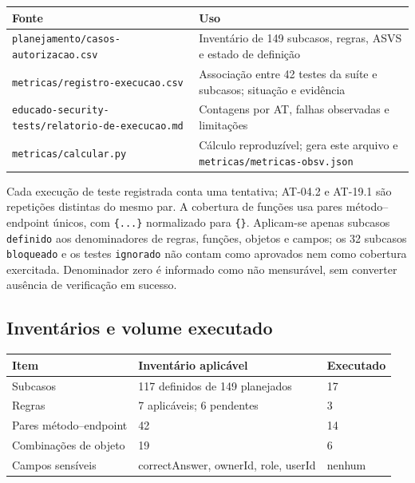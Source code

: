 {\def\LTcaptype{none} %
\begin{longtable}[]{@{}
  >{\raggedright\arraybackslash}p{}
  >{\raggedright\arraybackslash}p{}@{}}
\toprule\noalign{}
\begin{minipage}[b]{\linewidth}\raggedright
Fonte
\end{minipage} & \begin{minipage}[b]{\linewidth}\raggedright
Uso
\end{minipage} \\
\midrule\noalign{}
\endhead
\bottomrule\noalign{}
\endlastfoot
\texttt{planejamento/\allowbreak{}casos-autorizacao.csv} & Inventário de 149
subcasos, regras, ASVS e estado de definição \\
\texttt{metricas/\allowbreak{}registro-execucao.csv} & Associação entre 42 testes da
suíte e subcasos; situação e evidência \\
\texttt{educado-security-tests/\allowbreak{}relatorio-de-execucao.md} & Contagens por
AT, falhas observadas e limitações \\
\texttt{metricas/\allowbreak{}calcular.py} & Cálculo reproduzível; gera este arquivo
e \texttt{metricas/\allowbreak{}metricas-obsv.json} \\
\end{longtable}
}

Cada execução de teste registrada conta uma tentativa; AT-04.2 e AT-19.1
são repetições distintas do mesmo par. A cobertura de funções usa pares
método--endpoint únicos, com \texttt{\{...\}} normalizado para
\texttt{\{\}}. Aplicam-se apenas subcasos \texttt{definido} aos
denominadores de regras, funções, objetos e campos; os 32 subcasos
\texttt{bloqueado} e os testes \texttt{ignorado} não contam como
aprovados nem como cobertura exercitada. Denominador zero é informado
como não mensurável, sem converter ausência de verificação em sucesso.

\subsection{Inventários e volume
executado}\label{inventuxe1rios-e-volume-executado}

{\def\LTcaptype{none} %
\begin{longtable}[]{@{}lll@{}}
\toprule\noalign{}
Item & Inventário aplicável & Executado \\
\midrule\noalign{}
\endhead
\bottomrule\noalign{}
\endlastfoot
Subcasos & 117 definidos de 149 planejados & 17 \\
Regras & 7 aplicáveis; 6 pendentes & 3 \\
Pares método--endpoint & 42 & 14 \\
Combinações de objeto & 19 & 6 \\
Campos sensíveis & correctAnswer, ownerId, role, userId & nenhum \\
\end{longtable}
}

